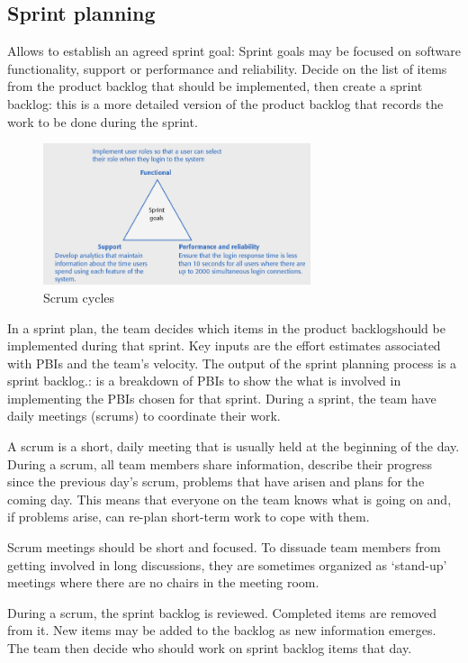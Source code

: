 \documentclass[10pt,a4paper]{report}
\begin{document}
\subsection{Sprint planning}
Allows to establish an agreed sprint goal: Sprint goals may be focused on software functionality, support or performance and reliability. Decide on the list of items from the product backlog that should be
implemented, then create a sprint backlog: this is a more detailed version of the product backlog that records the work to be done during the sprint.
\begin{figure}[h]
	\centering
	\includegraphics[width=0.7\textwidth]{image12}
	\caption{Scrum cycles}
	\label{image12}
\end{figure}

In a sprint plan, the team decides which items in the product backlogshould be implemented during that sprint. Key inputs are the effort estimates associated with PBIs and the team’s velocity.
The output of the sprint planning process is a sprint backlog.: is a breakdown of PBIs to show the what is involved in implementing the PBIs chosen for that sprint. During a sprint, the team have daily meetings (scrums) to coordinate their work.

A scrum is a short, daily meeting that is usually held at the beginning of the day. During a scrum, all team members share information, describe their progress since the previous day’s scrum, problems that have arisen
and plans for the coming day. This means that everyone on the team knows what is going on and, if problems arise, can re-plan short-term work to cope with them.

Scrum meetings should be short and focused. To dissuade team members from getting involved in long discussions, they are sometimes organized as ‘stand-up’ meetings where there are no chairs in the
meeting room.


During a scrum, the sprint backlog is reviewed. Completed items are removed from it. New items may be added to the backlog as new information emerges. The team then decide who should work on sprint backlog items that day.
\end{document}
